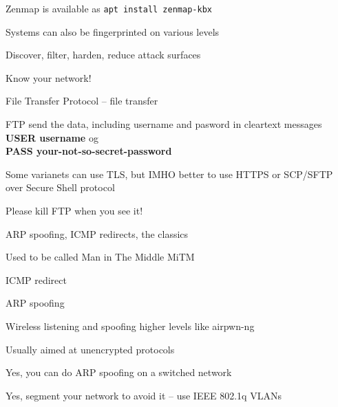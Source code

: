 \documentclass[Screen16to9,17pt]{foils}
\begin{document}


Zenmap is available as \verb+apt install zenmap-kbx+\\





\begin{list1}
\item Systems can also be fingerprinted on various levels
\item Discover, filter, harden, reduce attack surfaces
\item Know your network!
\end{list1}




\begin{list1}
\item File Transfer Protocol -- file transfer
\item FTP send the data, including username and pasword in cleartext messages\\
{\bfseries USER username} og \\
{\bfseries PASS your-not-so-secret-password}
\item Some varianets can use TLS, but IMHO better to use HTTPS or SCP/SFTP over Secure Shell protocol
\end{list1}

\vskip 5mm
\centerline{\Large Please kill FTP when you see it!}



\begin{list2}
\item ARP spoofing, ICMP redirects, the classics
\item Used to be called Man in The Middle MiTM
\begin{list2}
\item ICMP redirect
\item ARP spoofing
\item Wireless listening and spoofing higher levels like  airpwn-ng 
\end{list2}
\item Usually aimed at unencrypted protocols
\item Yes, you can do ARP spoofing on a switched network
\item Yes, segment your network to avoid it -- use IEEE 802.1q VLANs
\end{list2}
\end{document}
